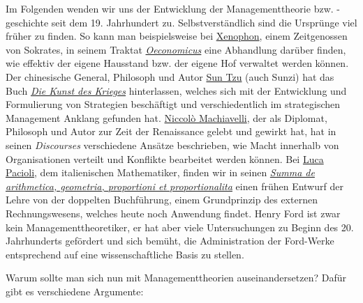 \documentclass[
  letterpaper,
]{book}
\begin{document}
Im Folgenden wenden wir uns der Entwicklung der Managementtheorie bzw.
-geschichte seit dem 19. Jahrhundert zu. Selbstverständlich sind die
Ursprünge viel früher zu finden. So kann man beispielsweise bei
\href{https://en.wikipedia.org/wiki/Xenophon}{Xenophon}, einem
Zeitgenossen von Sokrates, in seinem Traktat
\href{https://www.gutenberg.org/files/1173/1173-h/1173-h.htm}{\emph{Oeconomicus}}
eine Abhandlung darüber finden, wie effektiv der eigene Hausstand bzw.
der eigene Hof verwaltet werden können. Der chinesische General,
Philosoph und Autor \href{https://en.wikipedia.org/wiki/Sun_Tzu}{Sun
Tzu} (auch Sunzi) hat das Buch
\href{https://de.wikipedia.org/wiki/Die_Kunst_des_Krieges_(Sunzi)}{\emph{Die
Kunst des Krieges}} hinterlassen, welches sich mit der Entwicklung und
Formulierung von Strategien beschäftigt und verschiedentlich im
strategischen Management Anklang gefunden hat.
\href{https://en.wikipedia.org/wiki/Niccol\%C3\%B2_Machiavelli}{Niccolò
Machiavelli}, der als Diplomat, Philosoph und Autor zur Zeit der
Renaissance gelebt und gewirkt hat, hat in seinen \emph{Discourses
}verschiedene Ansätze beschrieben, wie Macht innerhalb von
Organisationen verteilt und Konflikte bearbeitet werden können. Bei
\href{https://en.wikipedia.org/wiki/Luca_Pacioli}{Luca Pacioli}, dem
italienischen Mathematiker, finden wir in seinen
\href{https://en.wikipedia.org/wiki/Summa_de_arithmetica}{\emph{Summa de
arithmetica, geometria, proportioni et proportionalita}} einen frühen
Entwurf der Lehre von der doppelten Buchführung, einem Grundprinzip des
externen Rechnungswesens, welches heute noch Anwendung findet. Henry
Ford ist zwar kein Managementtheoretiker, er hat aber viele
Untersuchungen zu Beginn des 20. Jahrhunderts gefördert und sich bemüht,
die Administration der Ford-Werke entsprechend auf eine
wissenschaftliche Basis zu stellen.

Warum sollte man sich nun mit Managementtheorien auseinandersetzen?
Dafür gibt es verschiedene Argumente:
\end{document}

